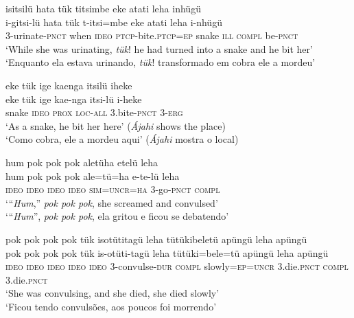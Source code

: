 \documentclass[output=paper,
modfonts,nonflat
]{langsci/langscibook}
\begin{document}
\ea isitsilü hata tük titsimbe eke atati leha inhügü\\[.3em]
\gll i-gitsi-lü hata tük t-itsi=mbe eke atati leha i-nhügü\\ 
3-urinate-\textsc{pnct} when \textsc{ideo} \textsc{ptcp}-bite\textsc{.ptcp=ep} snake \textsc{ill} \textsc{compl} be\textsc{-pnct}\\
\glt ‘While she was urinating, \textit{tük}! he had turned into a snake and he bit her’\\
‘Enquanto ela estava urinando, \textit{tük}! transformado em cobra ele a mordeu’ \\
\z

\newpage 
\ea eke tük ige kaenga itsilü iheke \\[.3em]
\gll eke tük ige kae-nga itsi-lü i-heke \\
snake \textsc{ideo} \textsc{prox} \textsc{loc-all} 3.bite\textsc{-pnct} \textsc{3-erg} \\
\glt ‘As a snake, he bit her here’ (\textit{Ájahi} shows the place) \\
‘Como cobra, ele a mordeu aqui’ (\textit{Ájahi} mostra o local) \\
\z

\ea hum pok pok pok{\footnotemark}{} aletüha etelü leha \\[.3em]
\gll hum pok pok pok ale=tü=ha e-te-lü leha \\
\textsc{ideo} \textsc{ideo} \textsc{ideo} \textsc{ideo} \textsc{sim=uncr=ha} 3-go\textsc{-pnct} \textsc{compl} \\
\glt ‘“\textit{Hum},” \textit{pok pok pok}, she screamed and convulsed’ \\
‘“\textit{Hum}”, \textit{pok pok pok}, ela gritou e ficou se debatendo’ \\
\z 



\ea pok pok pok pok tük isotütitagü leha tütükibeletü apüngü leha apüngü \\[.3em]
\gll pok pok pok pok tük is-otüti-tagü leha tütüki=bele=tü apüngü leha apüngü \\
\textsc{ideo} \textsc{ideo} \textsc{ideo} \textsc{ideo}  \textsc{ideo} 3-convulse-\textsc{dur} \textsc{compl} slowly\textsc{=ep=uncr} 3.die\textsc{.pnct} \textsc{compl} 3.die\textsc{.pnct} \\
\glt ‘She was convulsing, and she died, she died slowly’ \\
‘Ficou tendo convulsões, aos poucos foi morrendo’ \\
\z
\end{document}
